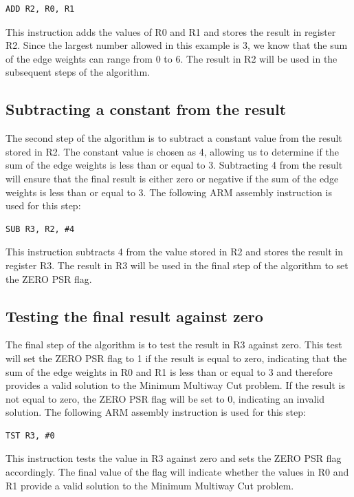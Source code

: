 \begin{verbatim}
ADD R2, R0, R1
\end{verbatim}

This instruction adds the values of R0 and R1 and stores the result in register R2. Since the largest number allowed in this example is 3, we know that the sum of the edge weights can range from 0 to 6. The result in R2 will be used in the subsequent steps of the algorithm.

\subsection{Subtracting a constant from the result}

The second step of the algorithm is to subtract a constant value from the result stored in R2. The constant value is chosen as 4, allowing us to determine if the sum of the edge weights is less than or equal to 3. Subtracting 4 from the result will ensure that the final result is either zero or negative if the sum of the edge weights is less than or equal to 3. The following ARM assembly instruction is used for this step:

\begin{verbatim}
SUB R3, R2, #4
\end{verbatim}

This instruction subtracts 4 from the value stored in R2 and stores the result in register R3. The result in R3 will be used in the final step of the algorithm to set the ZERO PSR flag.

\subsection{Testing the final result against zero}

The final step of the algorithm is to test the result in R3 against zero. This test will set the ZERO PSR flag to 1 if the result is equal to zero, indicating that the sum of the edge weights in R0 and R1 is less than or equal to 3 and therefore provides a valid solution to the Minimum Multiway Cut problem. If the result is not equal to zero, the ZERO PSR flag will be set to 0, indicating an invalid solution. The following ARM assembly instruction is used for this step:

\begin{verbatim}
TST R3, #0
\end{verbatim}

This instruction tests the value in R3 against zero and sets the ZERO PSR flag accordingly. The final value of the flag will indicate whether the values in R0 and R1 provide a valid solution to the Minimum Multiway Cut problem.

